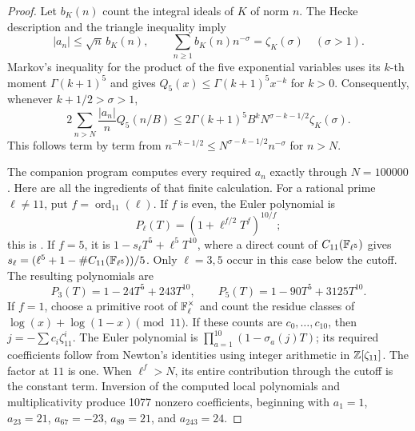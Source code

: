 \begin{proof}
Let $b_K(n)$ count the integral ideals of $K$ of norm $n$.
The Hecke description and the triangle inequality imply
\[
|a_n|\leq \sqrt n\,b_K(n),\qquad
\sum_{n\geq1}b_K(n)n^{-\sigma}=\zeta_K(\sigma)\quad(\sigma>1).
\]
Markov's inequality for the product of the five exponential variables
uses its $k$-th moment $\Gamma(k+1)^5$ and gives
$Q_5(x)\leq\Gamma(k+1)^5x^{-k}$ for $k>0$.
Consequently, whenever $k+1/2>\sigma>1$,
\[
2\sum_{n>N}\frac{|a_n|}{n}Q_5(n/B)
 \leq 2\Gamma(k+1)^5B^k
       N^{\sigma-k-1/2}\zeta_K(\sigma).
\tag{5.5}\label{eq:eleventail}
\]
This follows term by term from
$n^{-k-1/2}\leq N^{\sigma-k-1/2}n^{-\sigma}$ for $n>N$.

The companion program computes every required $a_n$ exactly through
$N=100000$. Here are all the ingredients of that finite calculation.
For a rational prime $\ell\ne11$, put
$f=\operatorname{ord}_{11}(\ell)$. If $f$ is even, the Euler polynomial
is
\[
P_\ell(T)=(1+\ell^{f/2}T^f)^{10/f};
\]
this is \citet[Lemma 1.1]{GrossRohrlich1978}.
If $f=5$, it is $1-s_\ell T^5+\ell^5T^{10}$, where a direct count
of $C_{11}(\mathbb F_{\ell^5})$ gives
$s_\ell=(\ell^5+1-\#C_{11}(\mathbb F_{\ell^5}))/5$.
Only $\ell=3,5$ occur in this case below the cutoff. The resulting
polynomials are
\[
P_3(T)=1-24T^5+243T^{10},\qquad
P_5(T)=1-90T^5+3125T^{10}.
\]
If $f=1$, choose a primitive root of $\mathbb F_\ell^\times$ and count the
residue classes of
$\log(x)+\log(1-x)\pmod{11}$. If these counts are $c_0,\ldots,c_{10}$,
then $j=-\sum c_i\zeta_{11}^i$.
The Euler polynomial is $\prod_{a=1}^{10}(1-\sigma_a(j)T)$;
its required coefficients follow from Newton's identities using
integer arithmetic in $\mathbb Z[\zeta_{11}]$.
The factor at $11$ is one. When $\ell^f>N$, its entire contribution
through the cutoff is the constant term. Inversion of the computed
local polynomials and multiplicativity produce 1077 nonzero
coefficients, beginning with $a_1=1$, $a_{23}=21$, $a_{67}=-23$,
$a_{89}=21$, and $a_{243}=24$.


\end{proof}
